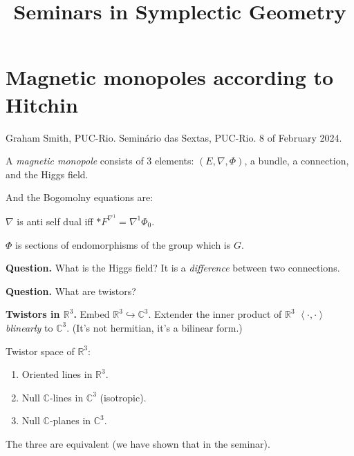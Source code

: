 



\title{Seminars in Symplectic Geometry}
\maketitle

\label{section-phantom}

\tableofcontents

\section{Magnetic monopoles according to
Hitchin}
\label{section-magnetic-monopoles-hitchin}

\noindent
Graham Smith, PUC-Rio.
Seminário das Sextas, PUC-Rio.
8 of February 2024.

\begin{definition}
\label{definition-mono-magnetic-monopole}
A \emph{magnetic monopole} consists of 3
elements: $(E,\nabla,\Phi)$, a bundle, a
connection, and the Higgs field.
\end{definition}

And the Bogomolny equations are:

\begin{lemma}
\label{lemma-mono-bogomolny}
$\nabla$ is anti self dual iff $*
F^{\nabla^1}=\nabla^1\Phi_0$.
\end{lemma}

\begin{remark}[Misha]
\label{remark-mono-misha}
$\Phi$ is sections of endomorphisms of the
group which is $G$.
\end{remark}

\medskip\noindent
{\bf Question.} What is the Higgs field? It
is a \emph{difference} between two
connections.

\medskip\noindent
{\bf Question.} What are twistors?

\medskip\noindent
{\bf Twistors in $\mathbb{R}^3$.}
Embed $\mathbb{R}^3 \hookrightarrow
\mathbb{C}^3$. Extender the inner product of
$\mathbb{R}^3$ $\left\langle{} \cdot,\cdot
\right\rangle{}$ \emph{blinearly} to
$\mathbb{C}^3$. (It's not hermitian, it's a
bilinear form.)

Twistor space of $\mathbb{R}^3$:

\begin{enumerate}
\item Oriented lines in $\mathbb{R}^3$.
\item Null $\mathbb{C}$-lines in
$\mathbb{C}^3$ (isotropic).
\item Null $\mathbb{C}$-planes in
$\mathbb{C}^3$.
\end{enumerate}
The three are equivalent (we have shown that
in the seminar).

